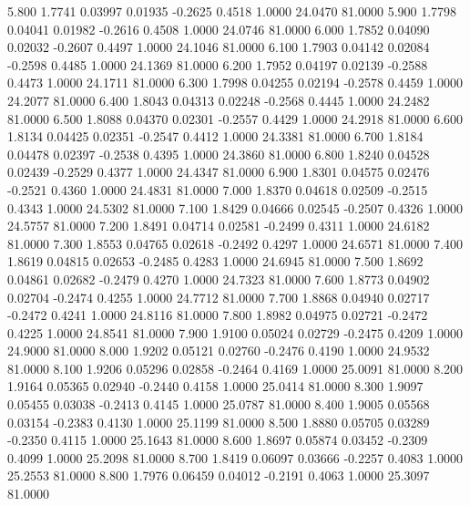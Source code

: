    5.800   1.7741   0.03997   0.01935  -0.2625   0.4518   1.0000  24.0470  81.0000
   5.900   1.7798   0.04041   0.01982  -0.2616   0.4508   1.0000  24.0746  81.0000
   6.000   1.7852   0.04090   0.02032  -0.2607   0.4497   1.0000  24.1046  81.0000
   6.100   1.7903   0.04142   0.02084  -0.2598   0.4485   1.0000  24.1369  81.0000
   6.200   1.7952   0.04197   0.02139  -0.2588   0.4473   1.0000  24.1711  81.0000
   6.300   1.7998   0.04255   0.02194  -0.2578   0.4459   1.0000  24.2077  81.0000
   6.400   1.8043   0.04313   0.02248  -0.2568   0.4445   1.0000  24.2482  81.0000
   6.500   1.8088   0.04370   0.02301  -0.2557   0.4429   1.0000  24.2918  81.0000
   6.600   1.8134   0.04425   0.02351  -0.2547   0.4412   1.0000  24.3381  81.0000
   6.700   1.8184   0.04478   0.02397  -0.2538   0.4395   1.0000  24.3860  81.0000
   6.800   1.8240   0.04528   0.02439  -0.2529   0.4377   1.0000  24.4347  81.0000
   6.900   1.8301   0.04575   0.02476  -0.2521   0.4360   1.0000  24.4831  81.0000
   7.000   1.8370   0.04618   0.02509  -0.2515   0.4343   1.0000  24.5302  81.0000
   7.100   1.8429   0.04666   0.02545  -0.2507   0.4326   1.0000  24.5757  81.0000
   7.200   1.8491   0.04714   0.02581  -0.2499   0.4311   1.0000  24.6182  81.0000
   7.300   1.8553   0.04765   0.02618  -0.2492   0.4297   1.0000  24.6571  81.0000
   7.400   1.8619   0.04815   0.02653  -0.2485   0.4283   1.0000  24.6945  81.0000
   7.500   1.8692   0.04861   0.02682  -0.2479   0.4270   1.0000  24.7323  81.0000
   7.600   1.8773   0.04902   0.02704  -0.2474   0.4255   1.0000  24.7712  81.0000
   7.700   1.8868   0.04940   0.02717  -0.2472   0.4241   1.0000  24.8116  81.0000
   7.800   1.8982   0.04975   0.02721  -0.2472   0.4225   1.0000  24.8541  81.0000
   7.900   1.9100   0.05024   0.02729  -0.2475   0.4209   1.0000  24.9000  81.0000
   8.000   1.9202   0.05121   0.02760  -0.2476   0.4190   1.0000  24.9532  81.0000
   8.100   1.9206   0.05296   0.02858  -0.2464   0.4169   1.0000  25.0091  81.0000
   8.200   1.9164   0.05365   0.02940  -0.2440   0.4158   1.0000  25.0414  81.0000
   8.300   1.9097   0.05455   0.03038  -0.2413   0.4145   1.0000  25.0787  81.0000
   8.400   1.9005   0.05568   0.03154  -0.2383   0.4130   1.0000  25.1199  81.0000
   8.500   1.8880   0.05705   0.03289  -0.2350   0.4115   1.0000  25.1643  81.0000
   8.600   1.8697   0.05874   0.03452  -0.2309   0.4099   1.0000  25.2098  81.0000
   8.700   1.8419   0.06097   0.03666  -0.2257   0.4083   1.0000  25.2553  81.0000
   8.800   1.7976   0.06459   0.04012  -0.2191   0.4063   1.0000  25.3097  81.0000
